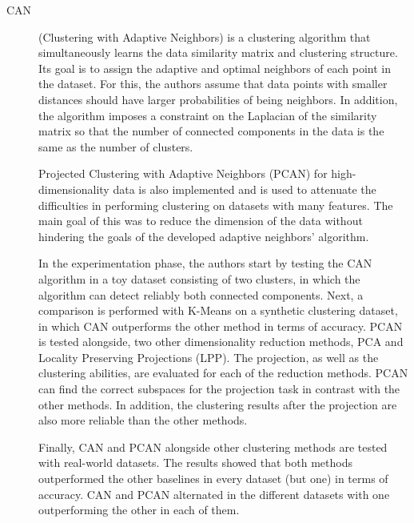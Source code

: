\begin{description}
    \item[CAN]\cite{Nie.Wang.ea_Clusteringprojectedclustering_2014a} (Clustering with Adaptive Neighbors) is a clustering algorithm that simultaneously learns the data similarity matrix and clustering structure. Its goal is to assign the adaptive and optimal neighbors of each point in the dataset. For this, the authors assume that data points with smaller distances should have larger probabilities of being neighbors. In addition, the algorithm imposes a constraint on the Laplacian of the similarity matrix so that the number of connected components in the data is the same as the number of clusters.
    
    Projected Clustering with Adaptive Neighbors (PCAN) for high-dimensionality data is also implemented and is used to attenuate the difficulties in performing clustering on datasets with many features. The main goal of this was to reduce the dimension of the data without hindering the goals of the developed adaptive neighbors' algorithm.

    In the experimentation phase, the authors start by testing the CAN algorithm in a toy dataset consisting of two clusters, in which the algorithm can detect reliably both connected components. Next, a comparison is performed with K-Means on a synthetic clustering dataset, in which CAN outperforms the other method in terms of accuracy. PCAN is tested alongside, two other dimensionality reduction methods, PCA and Locality Preserving Projections (LPP). The projection, as well as the clustering abilities, are evaluated for each of the reduction methods. PCAN can find the correct subspaces for the projection task in contrast with the other methods. In addition, the clustering results after the projection are also more reliable than the other methods. 

    Finally, CAN and PCAN alongside other clustering methods are tested with real-world datasets. The results showed that both methods outperformed the other baselines in every dataset (but one) in terms of accuracy. CAN and PCAN alternated in the different datasets with one outperforming the other in each of them.
\end{description}

